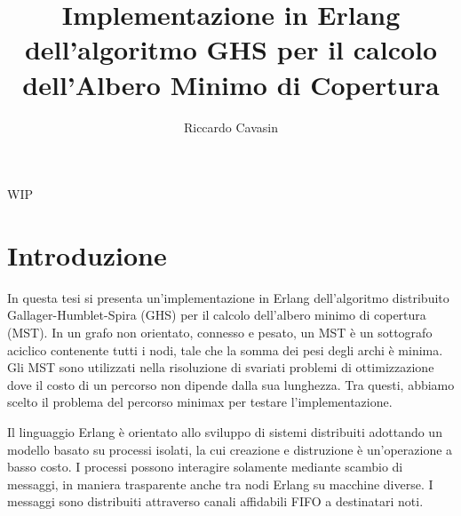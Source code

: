 \documentclass[target=bach,aauheader=,style=]{thud}
\title{Implementazione in Erlang dell'algoritmo GHS per il calcolo dell'Albero Minimo di Copertura}
\author{Riccardo Cavasin}
\begin{document}
\maketitle


\abstract
WIP

\tableofcontents



\mainmatter

\chapter{Introduzione}
In questa tesi si presenta un'implementazione in Erlang dell'algoritmo distribuito Gallager-Humblet-Spira (GHS) per il calcolo dell'albero minimo di copertura (MST). In un grafo non orientato, connesso e pesato, un MST è un sottografo aciclico contenente tutti i nodi, tale che la somma dei pesi degli archi è minima. Gli MST sono utilizzati nella risoluzione di svariati problemi di ottimizzazione dove il costo di un percorso non dipende dalla sua lunghezza. Tra questi, abbiamo scelto il problema del percorso minimax per testare l'implementazione.

Il linguaggio Erlang è orientato allo sviluppo di sistemi distribuiti adottando un modello basato su processi isolati, la cui creazione e distruzione è un'operazione a basso costo. I processi possono interagire solamente mediante scambio di messaggi, in maniera trasparente anche tra nodi Erlang su macchine diverse. I messaggi sono distribuiti attraverso canali affidabili FIFO a destinatari noti.
\end{document}

